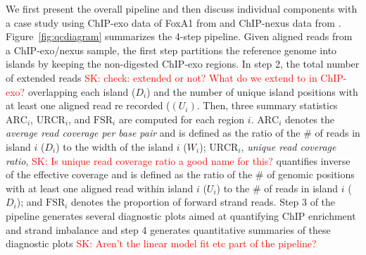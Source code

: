 \documentclass{bmcart}
\newcommand{\SK}[1]{\textcolor{red}{SK: #1}}
\begin{document}
We first present the overall pipeline and then discuss
individual components with a case study using ChIP-exo data of FoxA1  
from \cite{exoillumina} and ChIP-nexus data from \cite{chipnexus}.
Figure~\ref{fig:qcdiagram} summarizes  the 4-step pipeline. 
Given aligned reads from a  ChIP-exo/nexus sample, the first step partitions the reference genome into islands by keeping the
non-digested ChIP-exo regions.  In step 2,   the total
number of extended reads \SK{check: extended or not? What do we extend to in ChIP-exo? } overlapping each island ($D_i$) and the number of
unique island positions with at least one aligned read re recorded ($(U_i)$. Then,  three summary statistics $\text{ARC}_i$, $\text{URCR}_i$, and $\text{FSR}_i$ are computed for each region $i$.  $\text{ARC}_i$ denotes the \textit{average read coverage per base pair} and is defined as the ratio of the
\#  of reads in island $i$ ($D_i$) to the width of the island $i$ ($W_i$);  $\text{URCR}_i$, \textit{unique read coverage ratio}, \SK{Is unique read coverage ratio a good name for this?} quantifies inverse of the effective coverage and is defined as the ratio of the \# of genomic positions with at least one aligned read within island $i$ ($U_i$) to the \# of reads in island $i$ ($D_i$);  and  $\text{FSR}_i$ denotes the proportion of forward strand reads.
Step 3 of the pipeline generates several diagnostic plots aimed at quantifying ChIP enrichment and strand imbalance and step 4 generates quantitative summaries of these diagnostic plots \SK{Aren't the linear model fit etc part of the pipeline?}
\end{document}
